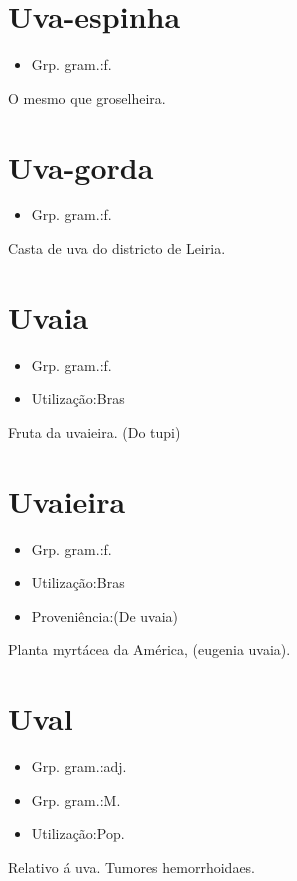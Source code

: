 \documentclass{article}
\begin{document}
\section{Uva-espinha}
\begin{itemize}
\item {Grp. gram.:f.}
\end{itemize}
O mesmo que \textunderscore groselheira\textunderscore .
\section{Uva-gorda}
\begin{itemize}
\item {Grp. gram.:f.}
\end{itemize}
Casta de uva do districto de Leiria.
\section{Uvaia}
\begin{itemize}
\item {Grp. gram.:f.}
\end{itemize}
\begin{itemize}
\item {Utilização:Bras}
\end{itemize}
Fruta da uvaieira.
(Do tupi)
\section{Uvaieira}
\begin{itemize}
\item {Grp. gram.:f.}
\end{itemize}
\begin{itemize}
\item {Utilização:Bras}
\end{itemize}
\begin{itemize}
\item {Proveniência:(De \textunderscore uvaia\textunderscore )}
\end{itemize}
Planta myrtácea da América, (\textunderscore eugenia uvaia\textunderscore ).
\section{Uval}
\begin{itemize}
\item {Grp. gram.:adj.}
\end{itemize}
\begin{itemize}
\item {Grp. gram.:M.}
\end{itemize}
\begin{itemize}
\item {Utilização:Pop.}
\end{itemize}
Relativo á uva.
Tumores hemorrhoidaes.
\end{document}
